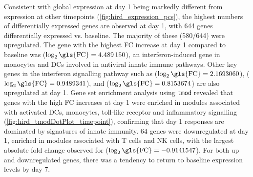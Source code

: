 Consistent with global expression at day 1 being markedly different from expression at other timepoints (\autoref{fig:hird_expression_pcs}), the highest numbers of differentially expressed genes are observed at day 1, with 644 genes differentially expressed vs. baseline.
The majority of these (580/644) were upregulated.
The gene with the highest \gls{FC} increase at day 1 compared to baseline was  ($\log_2\text{\gls{FC}} = \num{4.489150}$), an interferon-induced gene in monocytes and \glspl{DC} involved in antiviral innate immune pathways\autocite{bin2016AnkyrinRepeatDomain}.
Other key genes in the interferon signalling pathway\autocite{schneider2014InterferonStimulatedGenesComplex} such as  ($\log_2\text{\gls{FC}} = 2.1693060$),    ($\log_2\text{\gls{FC}} = 0.9489341$), and  ($\log_2\text{\gls{FC}} = 0.8153674$) are also upregulated at day 1.
Gene set enrichment analysis using \texttt{tmod} revealed that genes with the high \gls{FC} increases at day 1 were enriched in modules associated with activated \glspl{DC}, monocytes, toll-like receptor and inflammatory signalling (\autoref{fig:hird_tmodDotPlot_timepoint}), confirming that day 1 responses are dominated by signatures of innate immunity.
64 genes were downregulated at day 1, enriched in modules associated with T cells and \gls{NK} cells, with the largest absolute fold change observed for  ($\log_2\text{\gls{FC}} = -0.9141547$).
For both up and downregulated genes, there was a tendency to return to baseline expression levels by day 7.

